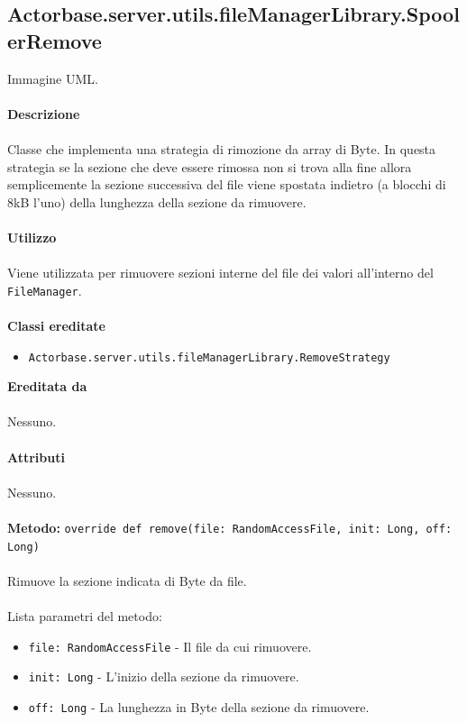 \documentclass[a4paper]{article}
\begin{document}
	\subsection{Actorbase.server.utils.fileManagerLibrary.SpoolerRemove}
		Immagine UML.
		\\ \\
		\textbf{Descrizione}
		\\ \\
		Classe che implementa una strategia di rimozione da array di Byte. In questa strategia se la sezione che deve essere rimossa non si trova alla fine allora semplicemente la sezione successiva del file viene spostata indietro (a blocchi di 8kB l'uno) della lunghezza della sezione da rimuovere.
		\\ \\
		\textbf{Utilizzo}
		\\ \\
		Viene utilizzata per rimuovere sezioni interne del file dei valori all'interno del \texttt{FileManager}.
		\\ \\
		\textbf{Classi ereditate}
		\begin{itemize}
		 \item \texttt{Actorbase.server.utils.fileManagerLibrary.RemoveStrategy}
		\end{itemize}
		\textbf{Ereditata da}
		\\ \\
		Nessuno.
		\\ \\
		\textbf{Attributi}
		\\ \\
		Nessuno.
		\\ \\
		\textbf{Metodo:} \texttt{override def remove(file: RandomAccessFile, init: Long, off: Long)}
		\\ \\
		Rimuove la sezione indicata di Byte da file.
		\\ \\
		Lista parametri del metodo:
		\begin{itemize}
			\item \texttt{file: RandomAccessFile} - Il file da cui rimuovere.
			\item \texttt{init: Long} - L'inizio della sezione da rimuovere.
			\item \texttt{off: Long} - La lunghezza in Byte della sezione da rimuovere.
		\end{itemize}
			
\end{document}
